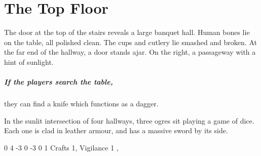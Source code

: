 \chapter{The Top Floor}

\setcounter{list}{0}

\begin{multicols}{2}

\begin{figure*}[t]
	
\end{figure*}


\begin{boxtext}

	The door at the top of the stairs reveals a large banquet hall.
	Human bones lie on the table, all polished clean.
	The cups and cutlery lie smashed and broken.
	At the far end of the hallway, a door stands ajar.
	On the right, a passageway with a hint of sunlight.

\end{boxtext}

\paragraph{If the players search the table,}
they can find a knife which functions as a dagger.


\begin{boxtext}

	In the sunlit intersection of four hallways, three ogres sit playing a game of dice.
	Each one is clad in leather armour, and has a massive sword by its side.

\end{boxtext}

{0}%
{4}%
{{-3}%
{0}%
{-3}}%
{0}%
{1}%
{Crafts 1, Vigilance 1}%
{\greatsword, \partialleather}%
{}








\end{multicols}

